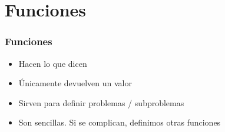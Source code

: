 \section{Funciones}

\begin{frame}
\frametitle{Funciones}

\begin{itemize}
	\item Hacen lo que dicen
	\item Únicamente devuelven un valor
	\item Sirven para definir problemas / subproblemas
	\item Son sencillas. Si se complican, definimos otras funciones
\end{itemize}

\end{frame}
